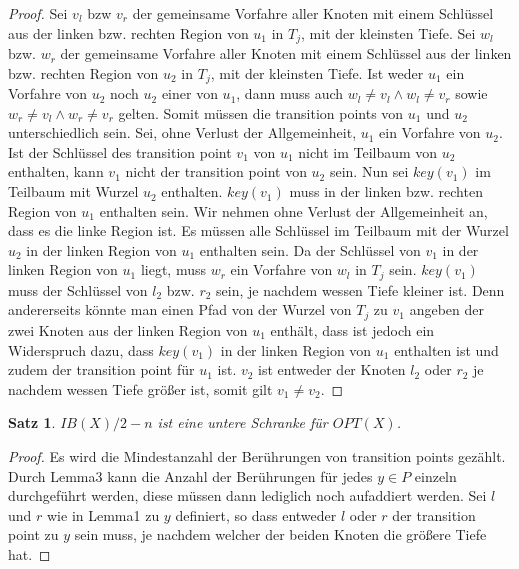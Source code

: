 \documentclass[a4paper,12pt]{article}
\begin{document}
\begin{proof}
 Sei $v_l$ bzw $v_r$ der gemeinsame Vorfahre aller Knoten mit einem Schlüssel aus der linken bzw. rechten Region von $u_1$ in $T_j$, mit der kleinsten Tiefe.  Sei $w_l$ bzw. $w_r$ der gemeinsame Vorfahre aller Knoten mit einem Schlüssel aus der linken bzw. rechten Region von $u_2$ in $T_j$, mit der kleinsten Tiefe. Ist weder $u_1$ ein Vorfahre von $u_2$ noch $u_2$ einer von $u_1$, dann muss auch $w_l \ne v_l \land w_l \ne v_r$ sowie $w_r \ne v_l \land w_r \ne v_r$ gelten. Somit müssen die transition points von $u_1$ und $u_2$ unterschiedlich sein. Sei, ohne Verlust der Allgemeinheit, $u_1$ ein Vorfahre von $u_2$. Ist der Schlüssel des transition point $v_1$ von $u_1$ nicht im Teilbaum von $u_2$ enthalten, kann $v_1$ nicht der transition point von $u_2$ sein. Nun sei $\mathit{key}\left(v_1\right)$ im Teilbaum mit Wurzel $u_2$ enthalten. $\mathit{key}\left(v_1\right)$ muss in der linken bzw. rechten Region von $u_1$ enthalten sein. Wir nehmen ohne Verlust der Allgemeinheit an, dass es die linke Region ist. Es müssen alle Schlüssel im Teilbaum mit der Wurzel $u_2$ in der linken Region von $u_1$ enthalten sein. Da der Schlüssel von $v_1$ in der linken Region von $u_1$ liegt, muss $w_r$ ein Vorfahre von $w_l$ in $T_j$ sein. $\mathit{key}\left(v_1\right)$ muss der Schlüssel von $l_2$ bzw. $r_2$ sein, je nachdem wessen Tiefe kleiner ist. Denn andererseits könnte man einen Pfad von der Wurzel von $T_j$ zu $v_1$ angeben der zwei Knoten aus der linken Region von $u_1$ enthält, dass ist jedoch ein Widerspruch dazu, dass  $\mathit{key}\left(v_1\right)$ in der linken Region von $u_1$ enthalten ist und zudem der transition point für $u_1$ ist. $v_2$ ist entweder der Knoten $l_2$ oder $r_2$ je nachdem wessen Tiefe größer ist, somit gilt $v_1 \ne v_2$.

\end{proof}
\newtheorem{Satz2}{Satz}[section] \label{satzDemaine1}
\begin{Satz2} 
$\mathit{IB}\left(X\right) /2 - n$ ist eine untere Schranke für $\mathit{OPT}\left(X\right)$.
\end{Satz2}
\begin{proof}
Es wird die Mindestanzahl der Berührungen von transition points gezählt. Durch Lemma3 kann die Anzahl der Berührungen für jedes $y \in P$ einzeln durchgeführt werden, diese müssen dann lediglich noch aufaddiert werden. Sei $l$ und $r$ wie in Lemma1 zu $y$ definiert, so dass entweder $l$ oder $r$ der transition point zu $y$ sein muss, je nachdem welcher der beiden Knoten die größere Tiefe hat.   
	
\end{proof}
\end{document}
